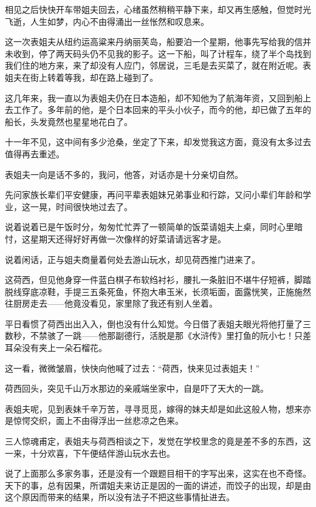\par 相见之后快快开车带姐夫回去，心绪虽然稍稍平静下来，却又再生感触，但觉时光飞逝，人生如梦，内心不由得涌出一丝怅然和叹息来。
\par 这一次表姐夫从纽约运高粱来丹纳丽芙岛，船要泊一个星期，他事先写给我的信并未收到，停了两天码头仍不见我的影子。这一下船，叫了计程车，绕了半个岛找到我们住的地方来，来了却没有人应门，邻居说，三毛是去买菜了，就在附近呢。表姐夫在街上转着等我，却在路上碰到了。
\par 这几年来，我一直以为表姐夫仍在日本造船，却不知他为了航海年资，又回到船上去工作了。多年前的他，是个日本回来的平头小伙子，而今的他，却已做了五年的船长，头发竟然也星星地花白了。
\par 十一年不见，这中间有多少沧桑，坐定了下来，却发觉我这方面，竟没有太多过去值得再去重述。
\par 表姐夫一向是话不多的，我问，他答，对话亦是十分亲切自然。
\par 先问家族长辈们平安健康，再问平辈表姐妹兄弟事业和行踪，又问小辈们年龄和学业，这一晃，时间很快地过去了。
\par 说着说着已是午饭时分，匆匆忙忙弄了一顿简单的饭菜请姐夫上桌，同时心里暗忖，这星期天还得好好再做一次像样的好菜请请远客才是。
\par 说着闲话，正与姐夫商量着何处去游山玩水，却见荷西推门进来了。
\par 这荷西，但见他身穿一件蓝白棋子布软绉衬衫，腰扎一条脏旧不堪牛仔短裤，脚踏脱线穿底凉鞋，手提三五条死鱼，怀抱大串玉米，长须垢面，面露恍笑，正施施然往厨房走去——他竟没看见，家里除了我还有别人坐着。
\par 平日看惯了荷西出出入入，倒也没有什么知觉。今日借了表姐夫眼光将他打量了三数秒，不禁骇了一跳——他那副德行，活脱是那《水浒传》里打鱼的阮小七！只差耳朵没有夹上一朵石榴花。
\par 这一看，微微皱眉，快快向他喊了过去：“荷西，快来见过表姐夫！”
\par 荷西回头，突见千山万水那边的亲戚端坐家中，自是吓了天大的一跳。
\par 表姐夫呢，见到表妹千辛万苦，寻寻觅觅，嫁得的妹夫却是如此这般人物，想来亦是惊愕交织，面上不由得浮出一丝悲凉之色来。
\par 三人惊魂甫定，表姐夫与荷西相谈之下，发觉在学校里念的竟是差不多的东西，这一来，十分欢喜，下午便结伴游山玩水去也。
\par 说了上面那么多家务事，还是没有一个跟题目相干的字写出来，这实在也不奇怪。天下的事，总有因果，所谓姐夫来访正是因的一面的讲述，而饺子的出现，却是由这个原因而带来的结果，所以没有法子不把这些事情扯进去。
\par  
